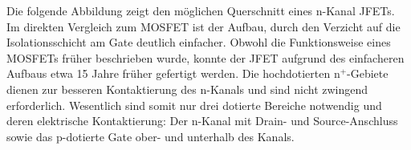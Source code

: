 {Die folgende Abbildung zeigt den möglichen Querschnitt eines n-Kanal JFETs. Im direkten Vergleich
zum MOSFET ist der Aufbau, durch den Verzicht auf die Isolationsschicht am Gate deutlich einfacher.
Obwohl die Funktionsweise eines MOSFETs früher beschrieben wurde, konnte der JFET aufgrund des
einfacheren Aufbaus etwa 15 Jahre früher gefertigt werden. Die hochdotierten $\mathrm{n^+}$-Gebiete dienen zur
besseren Kontaktierung des n-Kanals und sind nicht zwingend erforderlich. Wesentlich sind somit nur
drei dotierte Bereiche notwendig und deren elektrische Kontaktierung: Der n-Kanal mit Drain- und
Source-Anschluss sowie das p-dotierte Gate ober- und unterhalb des Kanals.


}
